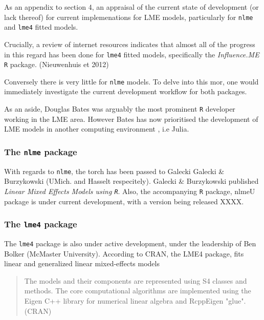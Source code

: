 \documentclass[a4paper,12pt]{article}
\begin{document}
As an appendix to section 4, an appraisal of the current state of development (or lack thereof) for current implemenations for LME models, particularly for
\texttt{nlme} and \texttt{lme4} fitted models.

Crucially, a review of internet resources indicates that almost all of the progress in this regard has been done for \texttt{lme4} fitted models, specifically the \textit{Influence.ME} \texttt{R} package. (Nieuwenhuis et 2012)

Conversely there is very little for \texttt{nlme} models. To delve into this mor, one would immediately investigate the current development workflow for both packages.


As an aside, Douglas Bates was arguably the most prominent \texttt{R} developer working in the LME area. 
However Bates has now prioritised the development of LME models in another computing environment , i.e Julia. 

\subsubsection*{The \texttt{nlme} package}

With regards to \texttt{nlme}, the torch has been passed to Galecki Galecki \& Burzykowski (UMich. and Hasselt respecitely).  Galecki \& Burzykowski published \textit{Linear Mixed Effects Models using \texttt{R}}. 
Also, the accompanying \texttt{R} package, nlmeU package is under current development, with a version being released XXXX.


\subsubsection*{The \texttt{lme4} package}

The \texttt{lme4} package is also under active development, under the leadership of Ben Bolker (McMaster University). According to CRAN, the LME4 package, fits linear and generalized linear mixed-effects models

\begin{quote}
	The models and their components are represented using S4 classes and methods. The core computational algorithms are implemented using the Eigen C++ library for numerical linear algebra and RcppEigen "glue".
	(CRAN)
\end{quote}
\end{document}

